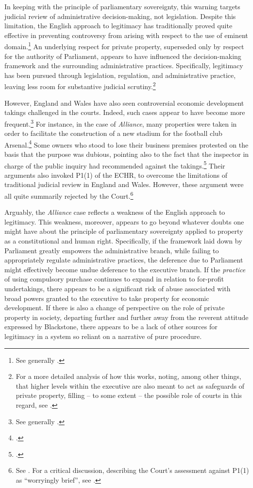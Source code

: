 In keeping with the principle of parliamentary sovereignty, this warning targets judicial review of administrative decision-making, not legislation. Despite this limitation, the English approach to legitimacy has traditionally proved quite effective in preventing controversy from arising with respect to the use of eminent domain.\footnote{See generally \cite{allen10}.} An underlying respect for private property, superseded only by respect for the authority of Parliament, appears to have influenced the decision-making framework and the surrounding administrative practices. Specifically, legitimacy has been pursued through legislation, regulation, and administrative practice, leaving less room for substantive judicial scrutiny.\footnote{For a more detailed analysis of how this works, noting, among other things, that higher levels within the executive are also meant to act as safeguards of private property, filling -- to some extent -- the possible role of courts in this regard, see \cite[85-100]{allen08}.}

However, England and Wales have also seen controversial economic development takings challenged in the courts. Indeed, such cases appear to have become more frequent.\footnote{See generally \cite{gray11}.} For instance, in the case of {\it Alliance}, many properties were taken in order to facilitate the construction of a new stadium for the football club Arsenal.\footcite{alliance06} Some owners who stood to lose their business premises protested on the basis that the purpose was dubious, pointing also to the fact that the inspector in charge of the public inquiry had recommended against the takings.\footcite[6-7]{alliance06} Their arguments also invoked P1(1) of the ECHR, to overcome the limitations of traditional judicial review in England and Wales. However, these argument were all quite summarily rejected by the Court.\footnote{See \cite[6-7]{alliance06}. For a critical discussion, describing the Court's assessment against P1(1) as ``worryingly brief'', see \cite[26]{gray11}.}

Arguably, the {\it Alliance} case reflects a weakness of the English approach to legitimacy. This weakness, moreover, appears to go beyond whatever doubts one might have about the principle of parliamentary sovereignty applied to property as a constitutional and human right. Specifically, if the framework laid down by Parliament greatly empowers the administrative branch, while failing to appropriately regulate administrative practices, the deference due to Parliament might effectively become undue deference to the executive branch. If the {\it practice} of using compulsory purchase continues to expand in relation to for-profit undertakings, there appears to be a significant risk of abuse associated with broad powers granted to the executive to take property for economic development. If there is also a change of perspective on the role of private property in society, departing further and further away from the reverent attitude expressed by Blackstone, there appears to be a lack of other sources for legitimacy in a system so reliant on a narrative of pure procedure.

